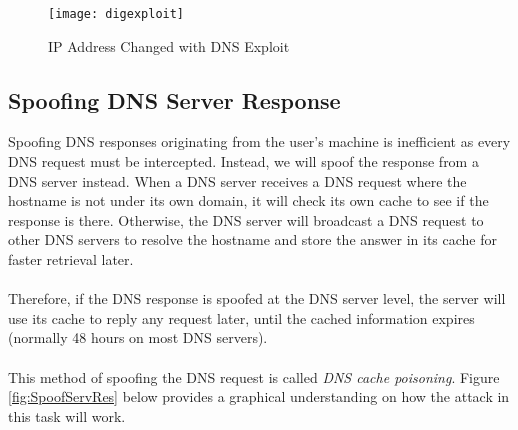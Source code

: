 \documentclass[a4paper,12pt]{article}
\begin{document}
\begin{figure}[H]
\centering
\texttt{[image: digexploit]}
\caption{IP Address Changed with DNS Exploit}
\label{fig:digexploit}
\end{figure}
\subsection{Spoofing DNS Server Response}
\begin{par}
Spoofing DNS responses originating from the user's machine is inefficient as every DNS request must be intercepted. Instead, we will spoof the response from a DNS server instead. When a DNS server receives a DNS request where the hostname is not under its own domain, it will check its own cache to see if the response is there. Otherwise, the DNS server will broadcast a DNS request to other DNS servers to resolve the hostname and store the answer in its cache for faster retrieval later. \\\\Therefore, if the DNS response is spoofed at the DNS server level, the server will use its cache to reply any request later, until the cached information expires (normally 48 hours on most DNS servers).\\\\This method of spoofing the DNS request is called \textit{DNS cache poisoning}. Figure \ref{fig:SpoofServRes} below provides a graphical understanding on how the attack in this task will work.


\begin{figure}[H]
					\centering
\end{figure}
\end{par}
\end{document}
